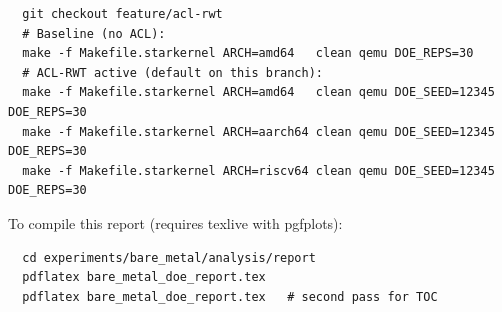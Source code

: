 \documentclass[10pt,a4paper]{article}
\begin{document}
\begin{verbatim}
  git checkout feature/acl-rwt
  # Baseline (no ACL):
  make -f Makefile.starkernel ARCH=amd64   clean qemu DOE_REPS=30
  # ACL-RWT active (default on this branch):
  make -f Makefile.starkernel ARCH=amd64   clean qemu DOE_SEED=12345 DOE_REPS=30
  make -f Makefile.starkernel ARCH=aarch64 clean qemu DOE_SEED=12345 DOE_REPS=30
  make -f Makefile.starkernel ARCH=riscv64 clean qemu DOE_SEED=12345 DOE_REPS=30
\end{verbatim}

\noindent
To compile this report (requires texlive with pgfplots):
\begin{verbatim}
  cd experiments/bare_metal/analysis/report
  pdflatex bare_metal_doe_report.tex
  pdflatex bare_metal_doe_report.tex   # second pass for TOC
\end{verbatim}

\end{document}
